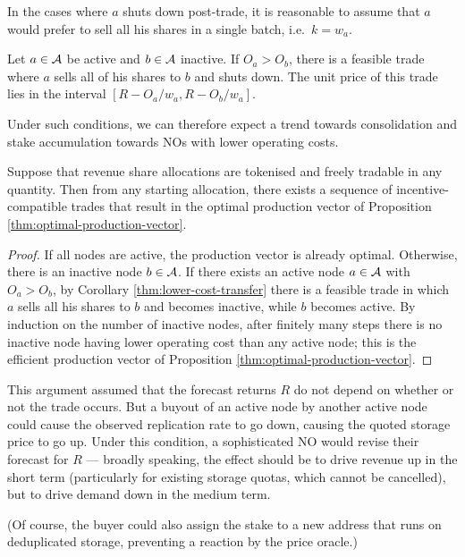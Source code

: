 In the cases where $a$ shuts down post-trade, it is reasonable to assume that $a$ would prefer to sell all his shares in a single batch, i.e.~$k=w_a$.

\begin{corollary}\label{thm:lower-cost-transfer}

  Let $a\in\mathcal{A}$ be active and $b\in\mathcal{A}$ inactive.
  If $O_a>O_b$, there is a feasible trade where $a$ sells all of his shares to $b$ and shuts down.
  The unit price of this trade lies in the interval $[R-O_a/w_a,R-O_b/w_a]$.

\end{corollary}

Under such conditions, we can therefore expect a trend towards consolidation and stake accumulation towards NOs with lower operating costs.

\begin{corollary}\label{thm:efficient-reallocation-is-possible}

  Suppose that revenue share allocations are tokenised and freely tradable in any quantity.
  Then from any starting allocation, there exists a sequence of incentive-compatible trades that result in the optimal production vector of Proposition \ref{thm:optimal-production-vector}.

\end{corollary}
%
\begin{proof}

  If all nodes are active, the production vector is already optimal.
  Otherwise, there is an inactive node $b\in\mathcal{A}$.
  If there exists an active node $a\in\mathcal{A}$ with $O_a>O_b$, by Corollary \ref{thm:lower-cost-transfer} there is a feasible trade in which $a$ sells all his shares to $b$ and becomes inactive, while $b$ becomes active.
  By induction on the number of inactive nodes, after finitely many steps there is no inactive node having lower operating cost than any active node; this is the efficient production vector of Proposition \ref{thm:optimal-production-vector}. \qedhere

\end{proof}

\begin{remark}

  This argument assumed that the forecast returns $R$ do not depend on whether or not the trade occurs. 
  But a buyout of an active node by another active node could cause the observed replication rate to go down, causing the quoted storage price to go up. 
  Under this condition, a sophisticated NO would revise their forecast for $R$ --- broadly speaking, the effect should be to drive revenue up in the short term (particularly for existing storage quotas, which cannot be cancelled), but to drive demand down in the medium term.
  
  (Of course, the buyer could also assign the stake to a new address that runs on deduplicated storage, preventing a reaction by the price oracle.)

\end{remark}



